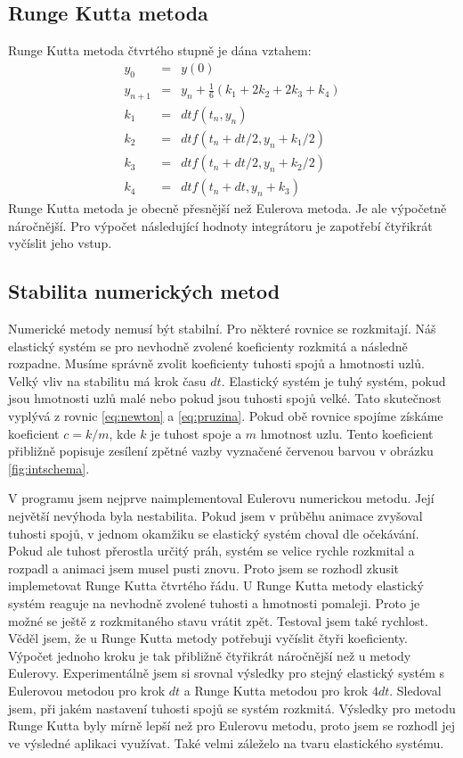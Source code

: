 \subsection{Runge Kutta metoda}
Runge Kutta metoda čtvrtého stupně je dána vztahem:
\begin{eqnarray*}
\label{eq:rungeint}
y_0     &=& y(0)    \\
y_{n+1} &=& y_{n} + \frac{1}{6}(k_1 + 2k_2 + 2k_3 + k_4) \\
k_1     &=& dt f(t_n,y_n) \\
k_2     &=& dt f(t_n+dt/2,y_n+k_1/2) \\
k_3     &=& dt f(t_n+dt/2,y_n+k_2/2) \\
k_4     &=& dt f(t_n+dt,y_n+k_3)
\end{eqnarray*}
Runge Kutta metoda je obecně přesnější než Eulerova metoda.
Je ale výpočetně náročnější.
Pro výpočet následující hodnoty integrátoru je zapotřebí čtyřikrát vyčíslit jeho vstup.

\subsection{Stabilita numerických metod}
Numerické metody nemusí být stabilní.
Pro některé rovnice se rozkmitají.
Náš elastický systém se pro nevhodně zvolené koeficienty rozkmitá a následně rozpadne.
Musíme správně zvolit koeficienty tuhosti spojů a hmotnosti uzlů.
Velký vliv na stabilitu má krok času $dt$.
Elastický systém je tuhý systém, pokud jsou hmotnosti uzlů malé nebo pokud jsou tuhosti spojů velké.
Tato skutečnost vyplývá z rovnic \ref{eq:newton} a \ref{eq:pruzina}.
Pokud obě rovnice spojíme získáme koeficient $c=k/m$, kde $k$ je tuhost spoje a $m$ hmotnost uzlu.
Tento koeficient přibližně popisuje zesílení zpětné vazby vyznačené červenou barvou v obrázku \ref{fig:intschema}.

V programu jsem nejprve naimplementoval Eulerovu numerickou metodu.
Její největší nevýhoda byla nestabilita.
Pokud jsem v průběhu animace zvyšoval tuhosti spojů, v jednom okamžiku se elastický systém choval dle očekávání.
Pokud ale tuhost přerostla určitý práh, systém se velice rychle rozkmital a rozpadl a animaci jsem musel pusti znovu.
Proto jsem se rozhodl zkusit implemetovat Runge Kutta čtvrtého řádu.
U Runge Kutta metody elastický systém reaguje na nevhodně zvolené tuhosti a hmotnosti pomaleji.
Proto je možné se ještě z rozkmitaného stavu vrátit zpět.
Testoval jsem také rychlost.
Věděl jsem, že u Runge Kutta metody potřebuji vyčíslit čtyři koeficienty.
Výpočet jednoho kroku je tak přibližně čtyřikrát náročnější než u metody Eulerovy.
Experimentálně jsem si srovnal výsledky pro stejný elastický systém s Eulerovou metodou pro krok $dt$ a Runge Kutta metodou pro krok $4dt$.
Sledoval jsem, při jakém nastavení tuhosti spojů se systém rozkmitá.
Výsledky pro metodu Runge Kutta byly mírně lepší než pro Eulerovu metodu, proto jsem se rozhodl jej ve výsledné aplikaci využívat.
Také velmi záleželo na tvaru elastického systému.






